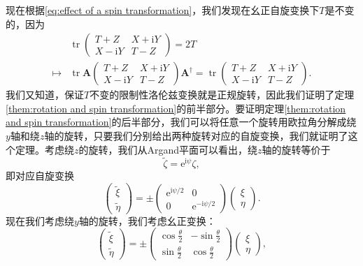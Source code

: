 现在根据\ref{eq:effect of a spin transformation}，我们发现在幺正自旋变换下$T$是不变的，因为
\begin{equation*}
	\begin{aligned}
		& \operatorname{tr}\begin{pmatrix}
			T+Z & X+\mathrm{i} Y\\
			X-\mathrm{i} Y & T-Z
		\end{pmatrix} =2T\\
		\mapsto  & \operatorname{tr}\boldsymbol{A}\begin{pmatrix}
			T+Z & X+\mathrm{i} Y\\
			X-\mathrm{i} Y & T-Z
		\end{pmatrix}\boldsymbol{A}^{\dagger } =\operatorname{tr}\begin{pmatrix}
			T+Z & X+\mathrm{i} Y\\
			X-\mathrm{i} Y & T-Z
		\end{pmatrix} .
	\end{aligned}
\end{equation*}
我们又知道，保证$T$不变的限制性洛伦兹变换就是正规旋转，因此我们证明了定理\ref{them:rotation and spin transformation}的前半部分。要证明定理\ref{them:rotation and spin transformation}的后半部分，我们可以将任意一个旋转用欧拉角分解成绕$y$轴和绕$z$轴的旋转，只要我们分别给出两种旋转对应的自旋变换，我们就证明了这个定理。考虑绕$z$的旋转，我们从Argand平面可以看出，绕$z$轴的旋转等价于
\begin{equation*}
	\tilde{\zeta } =\mathrm{e}^{\mathrm{i} \psi } \zeta ,
\end{equation*}
即对应自旋变换
\begin{equation*}
	\begin{pmatrix}
		\tilde{\xi }\\
		\tilde{\eta }
	\end{pmatrix} =\pm \begin{pmatrix}
		\mathrm{e}^{\mathrm{i} \psi /2} & 0\\
		0 & \mathrm{e}^{-\mathrm{i} \psi /2}
	\end{pmatrix}\begin{pmatrix}
		\xi \\
		\eta 
	\end{pmatrix} .
\end{equation*}
现在我们考虑绕$y$轴的旋转，我们考虑幺正变换：
\begin{equation*}
	\begin{pmatrix}
		\tilde{\xi }\\
		\tilde{\eta }
	\end{pmatrix} =\pm \begin{pmatrix}
		\cos\frac{\theta }{2} & -\sin\frac{\theta }{2}\\
		\sin\frac{\theta }{2} & \cos\frac{\theta }{2}
	\end{pmatrix}\begin{pmatrix}
		\xi \\
		\eta 
	\end{pmatrix} ,
\end{equation*}
